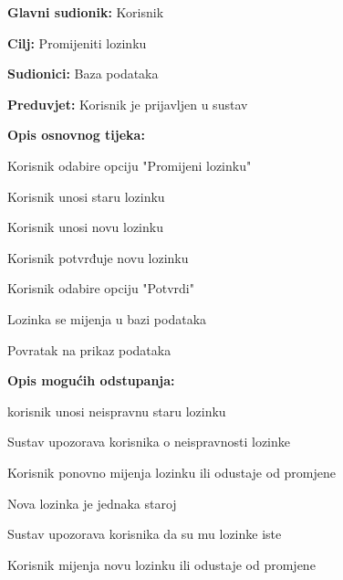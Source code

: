				\noindent {}
				\begin{packed_item}
					
					\item \textbf{Glavni sudionik: }Korisnik
					\item  \textbf{Cilj: }Promijeniti lozinku
					\item  \textbf{Sudionici: }Baza podataka
					\item  \textbf{Preduvjet: }Korisnik je prijavljen u sustav
					\item  \textbf{Opis osnovnog tijeka: }
					
					\item[] \begin{packed_enum}
						
						\item Korisnik odabire opciju "Promijeni lozinku"
						\item Korisnik unosi staru lozinku
						\item Korisnik unosi novu lozinku
						\item Korisnik potvrđuje novu lozinku
						\item Korisnik odabire opciju "Potvrdi"
						\item Lozinka se mijenja u bazi podataka
						\item Povratak na prikaz podataka
					\end{packed_enum}
					
					\item  \textbf{Opis mogućih odstupanja:}
					
					\item[] \begin{packed_item}
						
						\item[2.a] korisnik unosi neispravnu staru lozinku
						\item[] \begin{packed_enum}
							
							\item Sustav upozorava korisnika o neispravnosti lozinke
							\item Korisnik ponovno mijenja lozinku ili odustaje od promjene
							
						\end{packed_enum}
						\item[3.a] Nova lozinka je jednaka staroj
						\item[]\begin{packed_enum}
							
							\item Sustav upozorava korisnika da su mu lozinke iste
							\item Korisnik mijenja novu lozinku ili odustaje od promjene
							
						\end{packed_enum}
						
					\end{packed_item}
				\end{packed_item}
				
